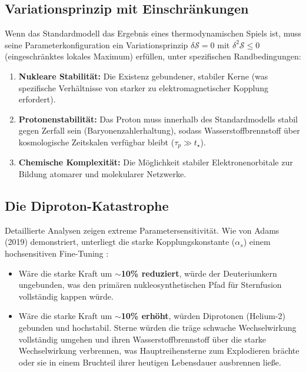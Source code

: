 \documentclass[12pt,a4paper]{article}
\theoremstyle{remark}
\begin{document}
\subsection{Variationsprinzip mit Einschr\"ankungen}

Wenn das Standardmodell das Ergebnis eines thermodynamischen Spiels ist, muss seine Parameterkonfiguration ein Variationsprinzip $\delta \mathcal{S} = 0$ mit $\delta^2 \mathcal{S} \leq 0$ (eingeschr\"anktes lokales Maximum) erf\"ullen, unter spezifischen Randbedingungen:
\begin{enumerate}
    \item \textbf{Nukleare Stabilit\"at:} Die Existenz gebundener, stabiler Kerne (was spezifische Verh\"altnisse von starker zu elektromagnetischer Kopplung erfordert).
    \item \textbf{Protonenstabilit\"at:} Das Proton muss innerhalb des Standardmodells stabil gegen Zerfall sein (Baryonenzahlerhaltung), sodass Wasserstoffbrennstoff \"uber kosmologische Zeitskalen verf\"ugbar bleibt ($\tau_p \gg t_\star$).
    \item \textbf{Chemische Komplexit\"at:} Die M\"oglichkeit stabiler Elektronenorbitale zur Bildung atomarer und molekularer Netzwerke.
\end{enumerate}

\subsection{Die Diproton-Katastrophe}

Detaillierte Analysen zeigen extreme Parametersensitivit\"at. Wie von Adams (2019) demonstriert, unterliegt die starke Kopplungskonstante ($\alpha_s$) einem hochsensitiven Fine-Tuning \citep{Adams2019}:

\begin{itemize}
    \item W\"are die starke Kraft um \textbf{$\sim$10\% reduziert}, w\"urde der Deuteriumkern ungebunden, was den prim\"aren nukleosynthetischen Pfad f\"ur Sternfusion vollst\"andig kappen w\"urde.
    \item W\"are die starke Kraft um \textbf{$\sim$10\% erh\"oht}, w\"urden Diprotonen (Helium-2) gebunden und hochstabil. Sterne w\"urden die tr\"age schwache Wechselwirkung vollst\"andig umgehen und ihren Wasserstoffbrennstoff \"uber die starke Wechselwirkung verbrennen, was Hauptreihensterne zum Explodieren br\"achte oder sie in einem Bruchteil ihrer heutigen Lebensdauer ausbrennen lie\ss{}e.
\end{itemize}
\end{document}
